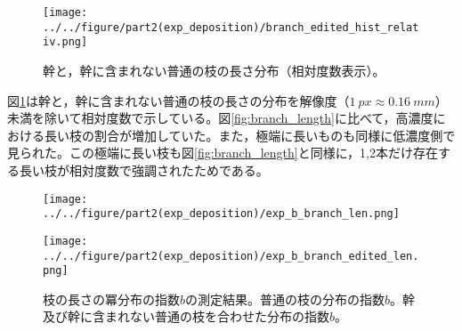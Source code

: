 \documentclass[autodetect-engine,dvi=dvipdfmx,a4paper,ja=standard,oneside,openany,11pt]{bxjsbook}
\begin{document}
\begin{figure}[htbp]
  \centering
  \texttt{[image: ../../figure/part2(exp\_deposition)/branch\_edited\_hist\_relativ.png]}
  \caption{幹と，幹に含まれない普通の枝の長さ分布（相対度数表示）。}
  \label{fig:branch_length_edited}
\end{figure}

図\ref{fig:branch_length_edited}は幹と，幹に含まれない普通の枝の長さの分布を解像度（$\SI{1}{px}\approx \SI{0.16}{mm}$）未満を除いて相対度数で示している。図\ref{fig:branch_length}に比べて，高濃度における長い枝の割合が増加していた。また，極端に長いものも同様に低濃度側で見られた。この極端に長い枝も図\ref{fig:branch_length}と同様に，1,2本だけ存在する長い枝が相対度数で強調されたためである。

\begin{figure}[htbp]
  \begin{minipage}
    {0.51\textwidth}
    \subcaption{}
    \centering
    \texttt{[image: ../../figure/part2(exp\_deposition)/exp\_b\_branch\_len.png]}
    \label{fig:exp_b_branch_len}
  \end{minipage}
  \begin{minipage}
    {0.49\textwidth}
    \subcaption{}
    \centering
    \texttt{[image: ../../figure/part2(exp\_deposition)/exp\_b\_branch\_edited\_len.png]}
    \label{fig:exp_b_branch_edited_len}
  \end{minipage}
  \caption{枝の長さの冪分布の指数$b$の測定結果。普通の枝の分布の指数$b$。幹及び幹に含まれない普通の枝を合わせた分布の指数$b$。}
  \label{fig:branch_length_exp}
\end{figure}
\end{document}
